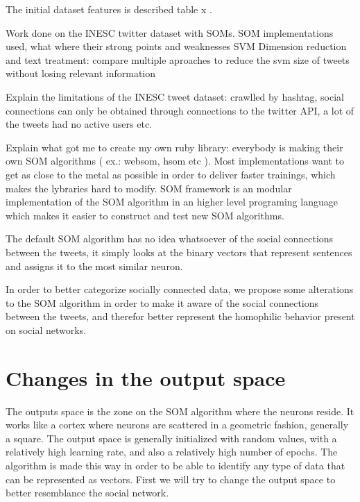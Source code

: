 The initial dataset features is described table x
 .


Work done on the INESC twitter dataset with SOMs.
SOM implementations used, what where their strong points and weaknesses
SVM Dimension reduction and text treatment: compare multiple aproaches to reduce the svm size of tweets without losing relevant information

\label{chap:crawling_twitter}
Explain the limitations of the INESC tweet dataset: crawlled by hashtag, social connections can only be obtained through connections to the twitter API, a lot of the tweets had no active users etc. 

Explain what got me to create my own ruby library: everybody is making their own SOM algorithms ( ex.: websom, hsom etc ). Most implementations want to get as close to the metal as possible in order to deliver faster trainings, which makes the lybraries hard to modify. SOM framework is an modular implementation of the SOM algorithm in an higher level programing language which makes it easier to construct and test new SOM algorithms.

The default \ac{SOM} algorithm has no idea whatsoever of the social connections between the tweets, it simply looks at the binary vectors that represent sentences and assigns it to the most similar neuron.

In order to better categorize socially connected data, we propose some alterations to the \ac{SOM} algorithm in order to make it aware of the social connections between the tweets, and therefor better represent the homophilic behavior present on social networks.

\chapter{Changes in the output space}
\label{cha:changes_in_the_output_space}
The outputs space is the zone on the \ac{SOM} algorithm where the neurons reside. It works like a cortex where neurons are scattered in a geometric fashion, generally a square. The output space is generally initialized with random values, with a relatively high learning rate, and also a relatively high number of epochs. The algorithm is made this way in order to be able to identify any type of data that can be represented as vectors.
First we will try to change the output space to better resemblance the social network.
\cleardoublepage
 
